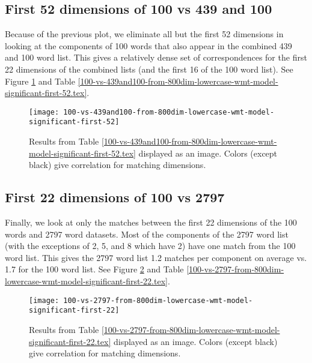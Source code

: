 \documentclass[eric_thesis.tex]{subfiles}
\begin{document}
\subsection{First 52 dimensions of 100 vs 439 and 100}

Because of the previous plot, we eliminate all but the first 52 dimensions in
looking at the components of 100 words that also appear in the combined 439
and 100 word list. This gives a relatively dense set of correspondences for the
first 22 dimensions of the combined lists (and the first 16 of the 100 word
list). See Figure \ref{fig:100vs439And100First52} and Table 
\ref{100-vs-439and100-from-800dim-lowercase-wmt-model-significant-first-52.tex}.



\begin{figure}[tbp]
    \texttt{[image: 100-vs-439and100-from-800dim-lowercase-wmt-model-significant-first-52]}
    \caption{Results from Table 
    \ref{100-vs-439and100-from-800dim-lowercase-wmt-model-significant-first-52.tex} 
    displayed as an image. Colors (except black) give correlation for matching 
    dimensions.}
    \label{fig:100vs439And100First52}
\end{figure}

\subsection{First 22 dimensions of 100 vs 2797}

Finally, we look at only the matches between the first 22 dimensions of the
100 words and 2797 word datasets. Most of the components of the 2797 word list 
(with the exceptions of 2, 5, and 8 which have 2) have one match from the 100 
word list. This gives the 2797 word list 1.2 matches per component on average
vs. 1.7 for the 100 word list.
See Figure \ref{fig:100vs2797First22} and
Table 
\ref{100-vs-2797-from-800dim-lowercase-wmt-model-significant-first-22.tex}.




\begin{figure}[tbp]
    \texttt{[image: 100-vs-2797-from-800dim-lowercase-wmt-model-significant-first-22]}
    \caption{Results from Table 
    \ref{100-vs-2797-from-800dim-lowercase-wmt-model-significant-first-22.tex} 
    displayed as an image. Colors (except black) give correlation for matching 
    dimensions.}
    \label{fig:100vs2797First22}
\end{figure}
\end{document}

